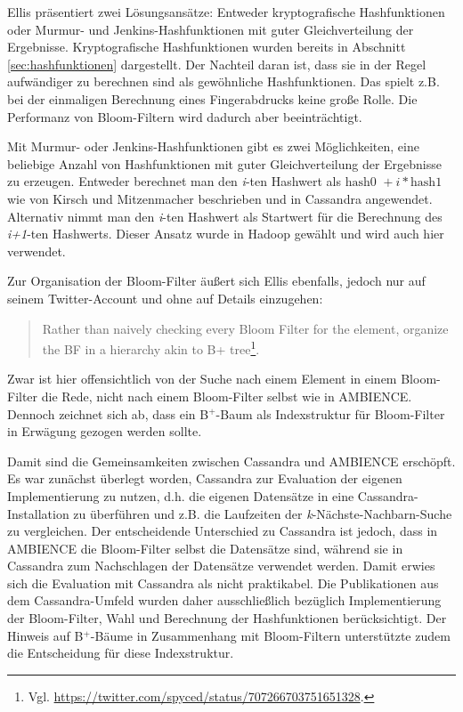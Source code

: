 Ellis präsentiert zwei Lösungsansätze: Entweder kryptografische Hashfunktionen oder Murmur- und Jenkins-Hashfunktionen mit guter Gleichverteilung der Ergebnisse. Kryptografische Hashfunktionen wurden bereits in Abschnitt \ref{sec:hashfunktionen} dargestellt. Der Nachteil daran ist, dass sie in der Regel aufwändiger zu berechnen sind als gewöhnliche Hashfunktionen. Das spielt z.B. bei der einmaligen Berechnung eines Fingerabdrucks keine große Rolle. Die Performanz von Bloom-Filtern wird dadurch aber beeinträchtigt. 

Mit Murmur- oder Jenkins-Hashfunktionen gibt es zwei Möglichkeiten, eine beliebige Anzahl von Hashfunktionen mit guter Gleichverteilung der Ergebnisse zu erzeugen. Entweder berechnet man den \textit{i}-ten Hashwert als $\text{hash0 }+ i\ast \text{hash1}$ wie von Kirsch und Mitzenmacher beschrieben und in Cassandra angewendet. Alternativ nimmt man den \textit{i}-ten Hashwert als Startwert für die Berechnung des \textit{i+1}-ten Hashwerts. Dieser Ansatz wurde in Hadoop gewählt und wird auch hier verwendet. 

Zur Organisation der Bloom-Filter äußert sich Ellis ebenfalls, jedoch nur auf seinem Twitter-Account und ohne auf Details einzugehen: 
\begin{quote}
Rather than naively checking every Bloom Filter for the element, organize the BF in a hierarchy akin to B+ tree\footnote{Vgl. \url{https://twitter.com/spyced/status/707266703751651328}.}.
\end{quote}
Zwar ist hier offensichtlich von der Suche nach einem Element in einem Bloom-Filter die Rede, nicht nach einem Bloom-Filter selbst wie in AMBIENCE. Dennoch zeichnet sich ab, dass ein B$^+$-Baum als Indexstruktur für Bloom-Filter in Erwägung gezogen werden sollte. 

Damit sind die Gemeinsamkeiten zwischen Cassandra und AMBIENCE erschöpft. Es war zunächst überlegt worden, Cassandra zur Evaluation der eigenen Implementierung zu nutzen, d.h. die eigenen Datensätze in eine Cassandra-Installation zu überführen und z.B. die Laufzeiten der \textit{k}-Nächste-Nachbarn-Suche zu vergleichen. Der entscheidende Unterschied zu Cassandra ist jedoch, dass in AMBIENCE die Bloom-Filter selbst die Datensätze sind, während sie in Cassandra zum Nachschlagen der Datensätze verwendet werden. Damit erwies sich die Evaluation mit Cassandra als nicht praktikabel. Die Publikationen aus dem Cassandra-Umfeld wurden daher ausschließlich bezüglich Implementierung der Bloom-Filter, Wahl und Berechnung der Hashfunktionen berücksichtigt. Der Hinweis auf B$^+$-Bäume in Zusammenhang mit Bloom-Filtern unterstützte zudem die Entscheidung für diese Indexstruktur. 
